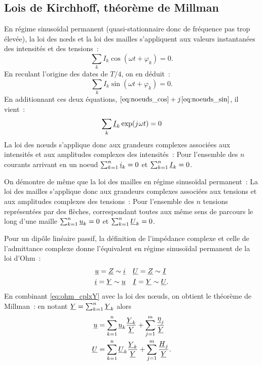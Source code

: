 \subsection{Lois de Kirchhoff, théorème de Millman}
En régime sinusoïdal permanent (quasi-stationnaire donc de fréquence 
pas trop élevée), la loi des n\oe{}ds et la loi des mailles 
s'appliquent aux valeurs instantanées des intensités et des tensions~:
\begin{equation}
  \label{eq:noeuds_cos}
  \sum_{k} I_k\cos(\omega t +\varphi_k) = 0.
\end{equation}
En reculant l'origine des dates de \(T/4\), on en déduit~:
\begin{equation}
  \label{eq:noeuds_sin}
  \sum_{k} I_k\sin(\omega t +\varphi_k) = 0.
\end{equation}
En additionnant ces deux équations, \(\eqref{eq:noeuds_cos} + {j\mkern1mu} 
\eqref{eq:noeuds_sin}\), il vient~:
\begin{equation}
  \label{eq:noeuds_cplx}
  \sum_k \underline{I}_k \exp({j\mkern1mu}\omega t) = 0
\end{equation}
La loi des nœuds s'applique donc aux grandeurs complexes associées aux 
intensités et aux amplitudes complexes des intensités~: Pour l'ensemble 
des \(n\) courants arrivant en un noeud \(\sum_{k=1}^n \underline{i}_k = 0\) et 
\(\sum_{k=1}^n \underline{I}_k = 0\).

On démontre de même que la loi des mailles en régime sinusoïdal 
permanent~: La loi des mailles s'applique donc aux grandeurs complexes 
associées aux tensions et aux amplitudes complexes des tensions~: Pour 
l'ensemble des \(n\) tensions représentées par des flèches, 
correspondant toutes aux même sens de parcours le long d'une maille 
\(\sum_{k=1}^n \underline{u}_k = 0\) et \(\sum_{k=1}^n \underline{U}_k = 0\).

Pour un dipôle linéaire passif, la définition de l'impédance complexe 
et celle de l'admittance complexe donne l'équivalent en régime 
sinusoïdal permanent de la loi d'Ohm~:
\begin{align}
  \label{eq:ohm_cplxZ}
  \underline{u} = \underline{Z} \sim \underline{i} &\quad \underline{U} = \underline{Z} \sim \underline{I} \\
  \label{eq:ohm_cplxY}
  \underline{i} = \underline{Y} \sim \underline{u} &\quad \underline{I} = \underline{Y} \sim \underline{U}.
\end{align}
En combinant \eqref{eq:ohm_cplxY} avec la loi des nœuds, on obtient le 
théorème de Millman~: en notant \(\underline{Y} = \sum_{k=1}^n \underline{Y}_k\) alors
\begin{align}
  \underline{u} & = \sum_{k=1}^n \underline{u}_k \frac{\underline{Y}_k}{\underline{Y}} + \sum_{j=1}^m 
  \frac{\underline{\eta}_j}{\underline{Y}} \\
  \underline{U} & = \sum_{k=1}^n \underline{U}_k \frac{\underline{Y}_k}{\underline{Y}} + \sum_{j=1}^m 
  \frac{\underline{H}_j}{\underline{Y}}.
\end{align}
